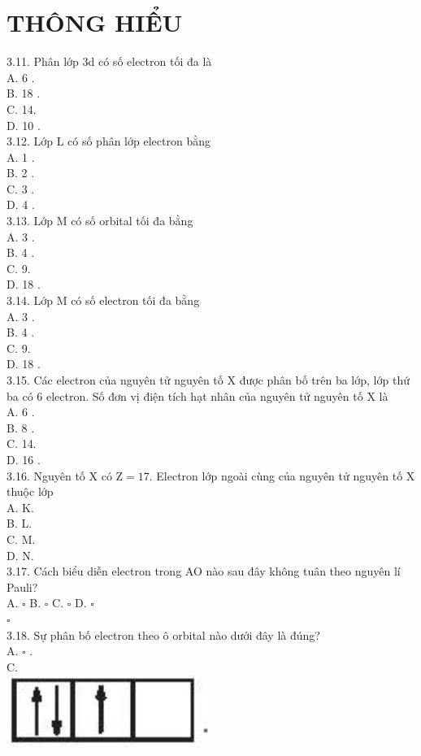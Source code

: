 \documentclass[10pt]{article}
\begin{document}
\section*{THÔNG HIỂU}
3.11. Phân lớp 3d có số electron tối đa là\\
A. 6 .\\
B. 18 .\\
C. 14.\\
D. 10 .\\
3.12. Lớp L có số phân lớp electron bằng\\
A. 1 .\\
B. 2 .\\
C. 3 .\\
D. 4 .\\
3.13. Lớp M có số orbital tối đa bằng\\
A. 3 .\\
B. 4 .\\
C. 9.\\
D. 18 .\\
3.14. Lớp M có số electron tối đa bằng\\
A. 3 .\\
B. 4 .\\
C. 9.\\
D. 18 .\\
3.15. Các electron của nguyên tử nguyên tố X được phân bố trên ba lớp, lớp thứ ba có 6 electron. Số đơn vị điện tích hạt nhân của nguyên tử nguyên tố X là\\
A. 6 .\\
B. 8 .\\
C. 14.\\
D. 16 .\\
3.16. Nguyên tố X có $\mathrm{Z}=17$. Electron lớp ngoài cùng của nguyên tử nguyên tố X thuộc lớp\\
A. K.\\
B. L.\\
C. M.\\
D. N.\\
3.17. Cách biểu diễn electron trong AO nào sau đây không tuân theo nguyên lí Pauli?\\
A. $\square$ B. $\square$ C. $\square$ D. $\square$\\
$\square$\\
3.18. Sự phân bố electron theo ô orbital nào dưới đây là đúng?\\
A. $\square$ .\\
C.\\
\includegraphics[max width=\textwidth, center]{2025_10_23_daab5c8457c85b365b9eg-06(1)}\\
\end{document}
